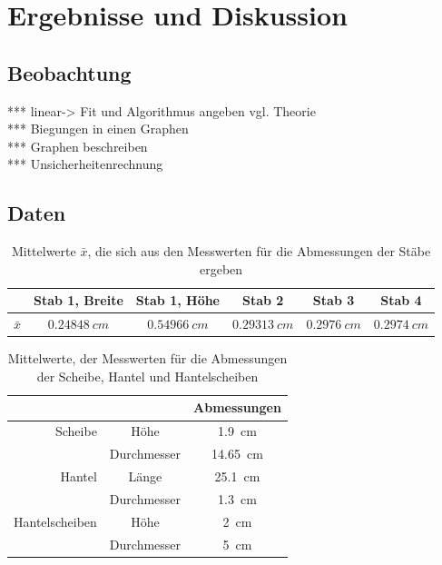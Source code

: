 \documentclass[
	a4paper,
	12pt,
	pagesize,
	ngerman
]{scrartcl}
\begin{document}
	\section{Ergebnisse und Diskussion}

	\subsection{Beobachtung}
	*** linear-> Fit und Algorithmus angeben vgl. Theorie\\
	*** Biegungen in einen Graphen \\
	*** Graphen beschreiben \\
	*** Unsicherheitenrechnung \\

	\subsection*{Daten}
	\begin{table}[H]
		\centering
		\begin{tabular}{ r | c | c | c | c | c |} 
			& Stab 1, Breite & Stab 1, Höhe  & Stab 2 & Stab 3 &  Stab 4 \\ \hline
			$ \bar{x} $  & $\SI{0,24848}{cm}$ &  $\SI{0,54966}{cm}$ &  $\SI{0,29313}{cm}$ &  $\SI{0,2976}{cm}$ & $\SI{0,2974}{cm}$  \\ \hline
		\end{tabular}
		\caption{Mittelwerte $ \bar{x} $, die sich aus den Messwerten für die Abmessungen der Stäbe ergeben}
		\label{Abmessungen_Stäbe}
	\end{table}
	
	\begin{table}[H]
		\centering
		\begin{tabular}{ r | c | c |} 
			& & Abmessungen\\ \hline
			Scheibe & Höhe & \SI{1,9}{\centi \meter }\\
			& Durchmesser & \SI{14,65}{\centi \meter }\\ \hline
			Hantel & Länge & \SI{25,1}{\centi \meter }\\
			& Durchmesser & \SI{1,3}{\centi \meter }\\ \hline
			Hantelscheiben & Höhe & \SI{2}{\centi \meter } \\
			& Durchmesser & \SI{5}{\centi \meter }\\ \hline
		\end{tabular}
		\caption{Mittelwerte, der Messwerten für die Abmessungen der Scheibe, Hantel und Hantelscheiben}
		\label{Abmessungen_Scheiben}
	\end{table}
	
\end{document}
